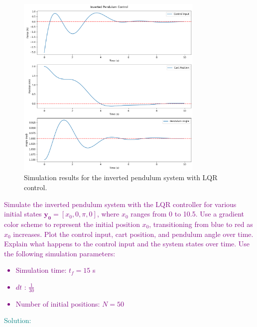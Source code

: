 \documentclass[a4 paper]{article}
\begin{document}
\begin{figure}[H]
    \centering
    \includegraphics[width=0.8\textwidth]{./figs/figs.png}
    \caption{Simulation results for the inverted pendulum system with LQR control.}
\end{figure}

\bigbreak

\newpage
\textcolor{purple}{
 Simulate the inverted pendulum system with the LQR controller for various initial states 
\(\mathbf{y_0} = [x_0, 0, \pi, 0]\), where \(x_0\) ranges from 0 to 10.5. Use a gradient color scheme to represent 
the initial position \(x_0\), transitioning from blue to red as \(x_0\) increases. 
Plot the control input, cart position, and pendulum angle over time. Explain what happens to the control input and the system states over time.
Use the following simulation parameters:
\begin{itemize}
    \item Simulation time: \( t_f = 15 \) s
    \item $dt$ : \( \frac{1}{30} \)
    \item Number of initial positions: \( N = 50 \)
\end{itemize}
}

\medbreak

\textcolor{teal}{
    Solution:
}
\end{document}
